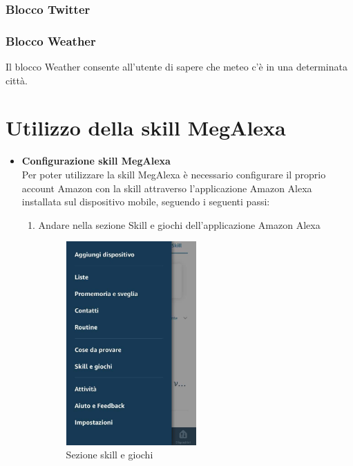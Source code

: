 \subsubsection{Blocco Twitter}


\subsubsection{Blocco Weather}
Il blocco Weather consente all'utente di sapere che meteo c'è in una determinata città.

\newpage
\section{Utilizzo della skill MegAlexa}

\begin{itemize}
\item  \textbf{Configurazione skill MegAlexa}\\
Per poter utilizzare la skill MegAlexa è necessario configurare il proprio account Amazon con la skill  attraverso l'applicazione Amazon Alexa installata sul dispositivo mobile, seguendo i seguenti passi:
\begin{enumerate}
	\item  Andare nella sezione Skill e giochi dell'applicazione Amazon Alexa 
	
	\begin{figure}[!ht]
		\centering
		\includegraphics[width=0.5\textwidth]{images/SkillGiochi.png}
		\caption{Sezione skill e giochi}
	\end{figure}
\newpage
	

\end{enumerate}
\end{itemize}
